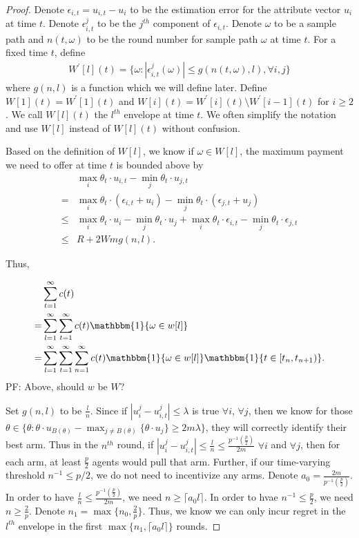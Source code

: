 \documentclass{article}
\newcommand{\pfcomment}[1]{{\color{blue}PF: #1}}
\begin{document}
\begin{proof}
Denote $\epsilon_{i,t}=u_{i,t}-u_{i}$ to be the estimation error for the attribute vector $u_i$ at time $t$. Denote $\epsilon_{i,t}^{j}$ to be the $j^{th}$ component of $\epsilon_{i,t}$. Denote $\omega$ to be a sample path and $n(t,\omega)$ to be the round number for sample path $\omega$ at time $t$. For a fixed time $t$, define
\begin{align}
W^{'}[l](t) = \{\omega:|\epsilon_{i,t}^{j}(\omega)|\leq g(n(t,\omega),l), \forall i,j\}\nonumber
\end{align}
where $g(n,l)$ is a function which we will define later. Define $W[1](t) = W^{'}[1](t)$ and $W[i](t) = W^{'}[i](t)\setminus W^{'}[i-1](t)$ for $i\geq 2$. We call $W[l](t)$ the $l^{th}$ envelope at time $t$. We often simplify the notation and use $W[l]$ instead of $W[l](t)$ without confusion.

Based on the definition of $W[l]$, we know if $\omega\in W[l]$, the maximum payment we need to offer at time $t$ is bounded above by 
\begin{align}
&\max_{i}\theta_t\cdot u_{i,t} - \min_{j}\theta_t\cdot u_{j,t} \nonumber \\
= &\max_{i}\theta_t\cdot (\epsilon_{i,t}+u_i) - \min_{j}\theta_t\cdot (\epsilon_{j,t}+u_j) \nonumber \\
\leq &\max_{i}\theta_t\cdot u_i - \min_{j}\theta_t\cdot u_j +\max_{i}\theta_t\cdot \epsilon_{i,t} - \min_{j}\theta_t\cdot \epsilon_{j,t}\nonumber \\
\leq & R + 2Wmg(n,l). \nonumber
\end{align}

Thus,

\begin{align}
&\sum_{t=1}^{\infty}c(t) \nonumber \\
=&\sum_{l=1}^{\infty}\sum_{t=1}^{\infty}c(t)\mathbbm{1}\{\omega\in w[l]\} \nonumber \\
=&\sum_{l=1}^{\infty}\sum_{t=1}^{\infty}\sum_{n=1}^{\infty}c(t)\mathbbm{1}\{\omega\in w[l]\}\mathbbm{1}\{t\in [t_n,t_{n+1})\}. \nonumber
\end{align}
\pfcomment{Above, should $w$ be $W$?}

Set $g(n,l)$ to be $\frac{l}{n}$. Since if $|u_{i}^{j}-u_{i,t}^{j}|\leq \lambda$ is true $\forall i$, $\forall j$, then we know for those $\theta\in \{\theta:\theta\cdot u_{B(\theta)}-\max_{j\neq B(\theta)}\{\theta \cdot u_{j}\}\geq 2m\lambda\}$, they will correctly identify their best arm. Thus in the $n^{th}$ round, if $|u_{i}^{j}-u_{i,t}^{j}|\leq \frac{l}{n} \leq \frac{p^{-1}(\frac{p}{2})}{2m}$ $\forall i$ and $\forall j$, then for each arm, at least $\frac{p}{2}$ agents would pull that arm. Further, if our time-varying threshold $n^{-1}\leq p/2$, we do not need to incentivize any arms. Denote $a_0=\frac{2m}{p^{-1}(\frac{p}{2})}$. In order to have $\frac{l}{n}\leq \frac{p^{-1}(\frac{p}{2})}{2m}$, we need $n\geq \lceil a_{0} l\rceil$. In order to hvae $n^{-1}\leq \frac{p}{2}$, we need $n\geq \frac{2}{p}$. Denote $n_1=\max\{n_{0}, \frac{2}{p}\}$. Thus, we know we can only incur regret in the $l^{th}$ envelope in the first $\max\{n_1,\lceil a_0 l\rceil\}$ rounds.


\end{proof}
\end{document}
